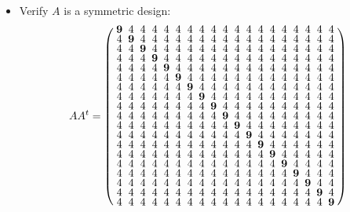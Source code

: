 \documentclass{beamer}
\begin{document}
\begin{frame}
  \begin{itemize}
  \item Verify $A$ is a symmetric design:
    \[
      AA^t =
      \arraycolsep=2.5pt\def\arraystretch{0.625}
      \left(
        \begin{array}{ccccccccccccccccccc}
          \mathbf{9}&4&4&4&4&4&4&4&4&4&4&4&4&4&4&4&4&4&4\\
          4&\mathbf{9}&4&4&4&4&4&4&4&4&4&4&4&4&4&4&4&4&4\\
          4&4&\mathbf{9}&4&4&4&4&4&4&4&4&4&4&4&4&4&4&4&4\\
          4&4&4&\mathbf{9}&4&4&4&4&4&4&4&4&4&4&4&4&4&4&4\\
          4&4&4&4&\mathbf{9}&4&4&4&4&4&4&4&4&4&4&4&4&4&4\\
          4&4&4&4&4&\mathbf{9}&4&4&4&4&4&4&4&4&4&4&4&4&4\\
          4&4&4&4&4&4&\mathbf{9}&4&4&4&4&4&4&4&4&4&4&4&4\\
          4&4&4&4&4&4&4&\mathbf{9}&4&4&4&4&4&4&4&4&4&4&4\\
          4&4&4&4&4&4&4&4&\mathbf{9}&4&4&4&4&4&4&4&4&4&4\\
          4&4&4&4&4&4&4&4&4&\mathbf{9}&4&4&4&4&4&4&4&4&4\\
          4&4&4&4&4&4&4&4&4&4&\mathbf{9}&4&4&4&4&4&4&4&4\\
          4&4&4&4&4&4&4&4&4&4&4&\mathbf{9}&4&4&4&4&4&4&4\\
          4&4&4&4&4&4&4&4&4&4&4&4&\mathbf{9}&4&4&4&4&4&4\\
          4&4&4&4&4&4&4&4&4&4&4&4&4&\mathbf{9}&4&4&4&4&4\\
          4&4&4&4&4&4&4&4&4&4&4&4&4&4&\mathbf{9}&4&4&4&4\\
          4&4&4&4&4&4&4&4&4&4&4&4&4&4&4&\mathbf{9}&4&4&4\\
          4&4&4&4&4&4&4&4&4&4&4&4&4&4&4&4&\mathbf{9}&4&4\\
          4&4&4&4&4&4&4&4&4&4&4&4&4&4&4&4&4&\mathbf{9}&4\\
          4&4&4&4&4&4&4&4&4&4&4&4&4&4&4&4&4&4&\mathbf{9}\\
        \end{array}
      \right)
    \]
  \end{itemize}
\end{frame}
\end{document}
